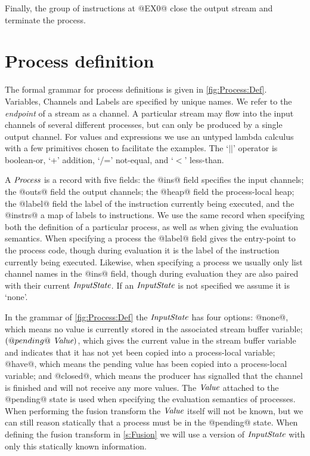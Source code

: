 Finally, the group of instructions at @EX0@ close the output stream and terminate the process.

\section{Process definition}



The formal grammar for process definitions is given in \autoref{fig:Process:Def}.
Variables, Channels and Labels are specified by unique names.
We refer to the \emph{endpoint} of a stream as a channel.
A particular stream may flow into the input channels of several different processes, but can only be produced by a single output channel.
For values and expressions we use an untyped lambda calculus with a few primitives chosen to facilitate the examples.
The `$||$' operator is boolean-or, `+' addition, `/=' not-equal, and `$<$' less-than.

A $\textit{Process}$ is a record with five fields: the @ins@ field specifies the input channels; the @outs@ field the output channels; the @heap@ field the process-local heap; the @label@ field the label of the instruction currently being executed, and the @instrs@ a map of labels to instructions.
We use the same record when specifying both the definition of a particular process, as well as when giving the evaluation semantics.
When specifying a process the @label@ field gives the entry-point to the process code, though during evaluation it is the label of the instruction currently being executed.
Likewise, when specifying a process we usually only list channel names in the @ins@ field, though during evaluation they are also paired with their current $\textit{InputState}$.
If an $\textit{InputState}$ is not specified we assume it is `none'.

In the grammar of \autoref{fig:Process:Def} the $\textit{InputState}$ has four options: @none@, which means no value is currently stored in the associated stream buffer variable; $(@pending@~\textit{Value})$, which gives the current value in the stream buffer variable and indicates that it has not yet been copied into a process-local variable; @have@, which means the pending value has been copied into a process-local variable; and @closed@, which means the producer has signalled that the channel is finished and will not receive any more values.
The $\textit{Value}$ attached to the @pending@ state is used when specifying the evaluation semantics of processes.
When performing the fusion transform the $\textit{Value}$ itself will not be known, but we can still reason statically that a process must be in the @pending@ state.
When defining the fusion transform in \autoref{s:Fusion} we will use a version of $\textit{InputState}$ with only this statically known information.

